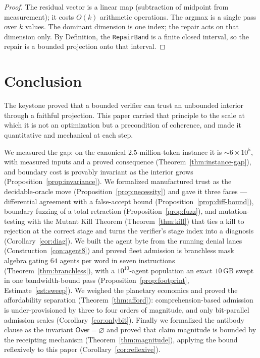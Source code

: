 \documentclass[11pt,oneside]{book}
\theoremstyle{definition}
\theoremstyle{plain}
\theoremstyle{remark}
\newcommand{\code}[1]{\texttt{#1}}
\newcommand{\Over}{\mathsf{Over}}
\begin{document}
\begin{proof}
The residual vector is a linear map (subtraction of midpoint from measurement); it costs
$O(k)$ arithmetic operations. The argmax is a single pass over $k$ values. The dominant
dimension is one index; the repair acts on that dimension only. By Definition, the
\code{RepairBand} is a finite closed interval, so the repair is a bounded projection onto
that interval.
\end{proof}

\chapter{Conclusion}
\label{ch:concl}

The keystone proved that a bounded verifier can trust an unbounded interior through a faithful
projection. This paper carried that principle to the scale at which it is not an optimization but
a precondition of coherence, and made it quantitative and mechanical at each step.

We measured the gap: on the canonical $2.5$-million-token instance it is
$\sim\!6\times 10^{5}$, with measured inputs and a proved consequence
(Theorem~\ref{thm:instance-gap}), and boundary cost is provably invariant as the interior grows
(Proposition~\ref{prop:invariance}). We formalized manufactured trust as the decidable-oracle move
(Proposition~\ref{prop:necessity}) and gave it three faces --- differential agreement with a
false-accept bound (Proposition~\ref{prop:diff-bound}), boundary fuzzing of a total retraction
(Proposition~\ref{prop:fuzz}), and mutation-testing with the Mutant Kill Theorem
(Theorem~\ref{thm:kill}) that ties a kill to rejection at the correct stage and turns the
verifier's stage index into a diagnosis (Corollary~\ref{cor:diag}). We built the agent byte from
the running denial lanes (Construction~\ref{con:agent8}) and proved fleet admission is branchless
mask algebra gating $64$ agents per word in seven instructions (Theorem~\ref{thm:branchless}),
with a $10^{10}$-agent population an exact $10\,\mathrm{GB}$ swept in one bandwidth-bound pass
(Proposition~\ref{prop:footprint}, Estimate~\ref{est:sweep}). We weighed the planetary economics
and proved the affordability separation (Theorem~\ref{thm:afford}): comprehension-based admission
is under-provisioned by three to four orders of magnitude, and only bit-parallel admission scales
(Corollary~\ref{cor:onlybit}). Finally we formalized the antibody clause as the invariant
$\Over=\varnothing$ and proved that claim magnitude is bounded by the receipting mechanism
(Theorem~\ref{thm:magnitude}), applying the bound reflexively to this paper
(Corollary~\ref{cor:reflexive}).
\end{document}
